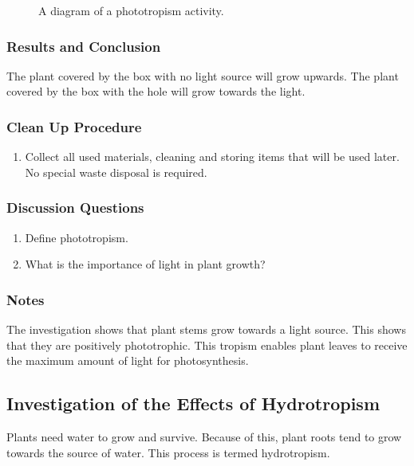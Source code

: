 \begin{figure}[h]
\begin{center}
\def\svgwidth{8cm}

\caption{A diagram of a phototropism activity.}
\label{fig:phototropism}
\end{center}
\end{figure}

\subsubsection*{Results and Conclusion}
The plant covered by the box with no light source will grow upwards. The plant covered by the box with the hole will grow towards the light.

\subsubsection*{Clean Up Procedure}
\begin{enumerate}
\item{Collect all used materials, cleaning and storing items that will be used later. No special waste disposal is required.}
\end{enumerate}

\subsubsection*{Discussion Questions}
\begin{enumerate}
\item{Define phototropism.}
\item{What is the importance of light in plant growth?}
\end{enumerate}

\subsubsection*{Notes}
The investigation shows that plant stems grow towards a light source. This shows that they are positively phototrophic. This tropism enables plant leaves to receive the maximum amount of light for photosynthesis.

\subsection{Investigation of the Effects of Hydrotropism}
Plants need water to grow and survive. Because of this, plant roots tend to grow towards the source of water. This process is termed hydrotropism.

